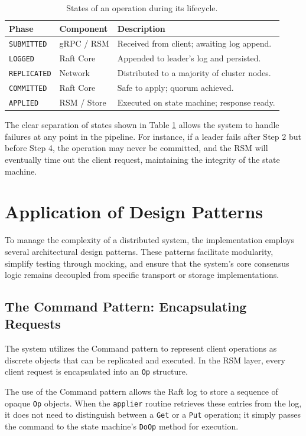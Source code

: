 \begin{table}[h]
\centering
\caption{States of an operation during its lifecycle.}
\label{tab:operation_states}
\begin{tabular}{|l|l|l|}
\hline
\textbf{Phase} & \textbf{Component} & \textbf{Description} \\ \hline
\texttt{SUBMITTED} & gRPC / RSM & Received from client; awaiting log append. \\ \hline
\texttt{LOGGED} & Raft Core & Appended to leader's log and persisted. \\ \hline
\texttt{REPLICATED} & Network & Distributed to a majority of cluster nodes. \\ \hline
\texttt{COMMITTED} & Raft Core & Safe to apply; quorum achieved. \\ \hline
\texttt{APPLIED} & RSM / Store & Executed on state machine; response ready. \\ \hline
\end{tabular}
\end{table}

The clear separation of states shown in Table \ref{tab:operation_states} allows the system to handle failures at any point in the pipeline. For instance, if a leader fails after Step 2 but before Step 4, the operation may never be committed, and the RSM will eventually time out the client request, maintaining the integrity of the state machine.

\section{Application of Design Patterns}
To manage the complexity of a distributed system, the implementation employs several architectural design patterns. These patterns facilitate modularity, simplify testing through mocking, and ensure that the system's core consensus logic remains decoupled from specific transport or storage implementations.

\subsection{The Command Pattern: Encapsulating Requests}
The system utilizes the Command pattern to represent client operations as discrete objects that can be replicated and executed.
In the RSM layer, every client request is encapsulated into an \texttt{Op} structure.

The use of the Command pattern allows the Raft log to store a sequence of opaque \texttt{Op} objects. When the \texttt{applier} routine retrieves these entries from the log, it does not need to distinguish between a \texttt{Get} or a \texttt{Put} operation; it simply passes the command to the state machine's \texttt{DoOp} method for execution.

